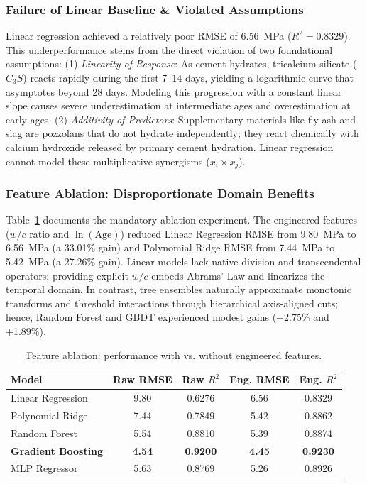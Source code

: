 \documentclass[10pt,conference,a4paper]{IEEEtran}
\begin{document}
\subsubsection{Failure of Linear Baseline \& Violated Assumptions}
Linear regression achieved a relatively poor RMSE of 6.56~MPa ($R^2 = 0.8329$). This underperformance stems from the direct violation of two foundational assumptions: (1) \emph{Linearity of Response}: As cement hydrates, tricalcium silicate ($C_3S$) reacts rapidly during the first 7--14 days, yielding a logarithmic curve that asymptotes beyond 28 days. Modeling this progression with a constant linear slope causes severe underestimation at intermediate ages and overestimation at early ages. (2) \emph{Additivity of Predictors}: Supplementary materials like fly ash and slag are pozzolans that do not hydrate independently; they react chemically with calcium hydroxide released by primary cement hydration. Linear regression cannot model these multiplicative synergisms ($x_i \times x_j$).

\subsubsection{Feature Ablation: Disproportionate Domain Benefits}
Table~\ref{tab:ablation} documents the mandatory ablation experiment. The engineered features ($w/c$ ratio and $\ln(\text{Age})$) reduced Linear Regression RMSE from 9.80~MPa to 6.56~MPa (a 33.01\% gain) and Polynomial Ridge RMSE from 7.44~MPa to 5.42~MPa (a 27.26\% gain). Linear models lack native division and transcendental operators; providing explicit $w/c$ embeds Abrams' Law and linearizes the temporal domain. In contrast, tree ensembles naturally approximate monotonic transforms and threshold interactions through hierarchical axis-aligned cuts; hence, Random Forest and GBDT experienced modest gains (+2.75\% and +1.89\%).

\begin{table}[htbp]
\centering
\caption{Feature ablation: performance with vs. without engineered features.}
\label{tab:ablation}
\begin{tabular}{lcccc}
\toprule
\textbf{Model} & \textbf{Raw RMSE} & \textbf{Raw $R^2$} & \textbf{Eng. RMSE} & \textbf{Eng. $R^2$} \\
\midrule
Linear Regression & 9.80 & 0.6276 & 6.56 & 0.8329 \\
Polynomial Ridge & 7.44 & 0.7849 & 5.42 & 0.8862 \\
Random Forest & 5.54 & 0.8810 & 5.39 & 0.8874 \\
\textbf{Gradient Boosting} & \textbf{4.54} & \textbf{0.9200} & \textbf{4.45} & \textbf{0.9230} \\
MLP Regressor & 5.63 & 0.8769 & 5.26 & 0.8926 \\
\bottomrule
\end{tabular}
\end{table}
\end{document}
